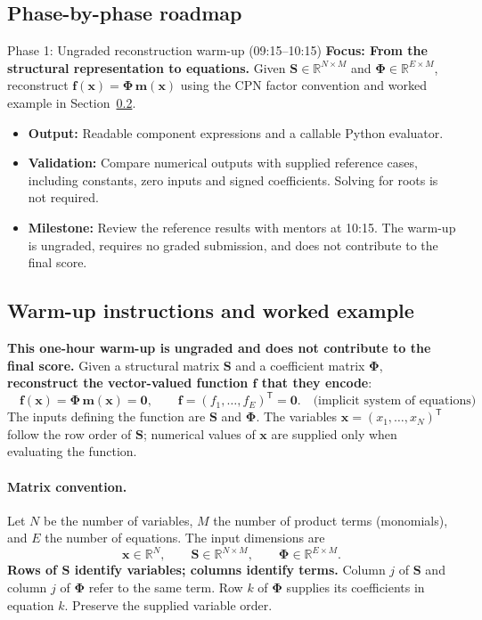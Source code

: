 \documentclass[11pt,a4paper]{article}
\begin{document}
\subsection{Phase-by-phase roadmap}

\begin{challengebox}{Phase 1: Ungraded reconstruction warm-up (09:15--10:15)}
  \textbf{Focus: From the structural representation to equations.} Given
  $\mathbf{S}\in\mathbb{R}^{N\times M}$ and $\boldsymbol{\Phi}\in\mathbb{R}^{E\times M}$, reconstruct
  $\mathbf f(\mathbf x)=\boldsymbol{\Phi}\,\mathbf m(\mathbf x)$ using the CPN factor convention
  and worked example in Section~\ref{sec:warmup}.
  \begin{itemize}[leftmargin=*, itemsep=1pt]
    \item \textbf{Output:} Readable component expressions and a callable Python evaluator.
    \item \textbf{Validation:} Compare numerical outputs with supplied reference cases,
          including constants, zero inputs and signed coefficients. Solving for roots is not required.
    \item \textbf{Milestone:} Review the reference results with mentors at 10:15.
          The warm-up is ungraded, requires no graded submission, and does not
          contribute to the final score.
  \end{itemize}
\end{challengebox}

\subsection{Warm-up instructions and worked example}\label{sec:warmup}
\textbf{This one-hour warm-up is ungraded and does not contribute to the final score.}
Given a structural matrix $\mathbf{S}$ and a coefficient matrix $\boldsymbol{\Phi}$,
\textbf{reconstruct the vector-valued function $\mathbf f$ that they encode}:
\[
  \boxed{\quad \mathbf f(\mathbf x)=\boldsymbol{\Phi}\,\mathbf m(\mathbf x)=\mathbf{0},\qquad
    \mathbf f=(f_1,\ldots,f_E)^\mathsf T=\mathbf{0}.\quad\textrm{(implicit system of equations)}\quad}
\]
The inputs defining the function are $\mathbf{S}$ and $\boldsymbol{\Phi}$. The variables
$\mathbf x=(x_1,\ldots,x_N)^\mathsf T$ follow the row order of $\mathbf{S}$;
numerical values of $\mathbf x$ are supplied only when evaluating the function.

\paragraph{Matrix convention.}
Let $N$ be the number of variables, $M$ the number of product terms (monomials), and $E$ the
number of equations. The input dimensions are
\[
  \mathbf x\in\mathbb R^N,\qquad \mathbf{S}\in\mathbb R^{N\times M},\qquad
  \boldsymbol{\Phi}\in\mathbb R^{E\times M}.
\]
\textbf{Rows of $\mathbf{S}$ identify variables; columns identify terms.} Column $j$ of
$\mathbf{S}$ and column $j$ of $\boldsymbol{\Phi}$ refer to the same term. Row $k$ of $\boldsymbol{\Phi}$ supplies
its coefficients in equation $k$. Preserve the supplied variable order.
\end{document}
